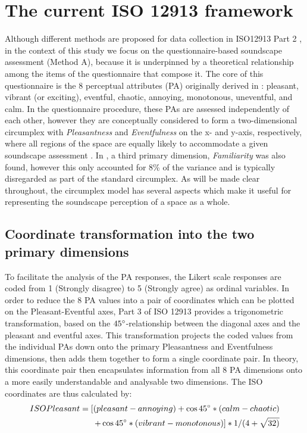 \section{The current ISO 12913 framework}
\label{sec:current}
Although different methods are proposed for data collection in ISO12913 Part 2 \citep{ISO12913Part2}, in the context of this study we focus on the questionnaire-based soundscape assessment (Method A), because it is underpinned by a theoretical relationship among the items of the questionnaire that compose it. The core of this questionnaire is the 8 perceptual attributes (PA) originally derived in \citet{Axelsson2010principal}: pleasant, vibrant (or exciting), eventful, chaotic, annoying, monotonous, uneventful, and calm. In the questionnaire procedure, these PAs are assessed independently of each other, however they are conceptually considered to form a two-dimensional circumplex with \textit{Pleasantness} and \textit{Eventfulness} on the x- and y-axis, respectively, where all regions of the space are equally likely to accommodate a given soundscape assessment \citep{Aletta2016Soundscape}. In \citet{Axelsson2010principal}, a third primary dimension, \textit{Familiarity} was also found, however this only accounted for 8\% of the variance and is typically disregarded as part of the standard circumplex. As will be made clear throughout, the circumplex model has several aspects which make it useful for representing the soundscape perception of a space as a whole.

\subsection{Coordinate transformation into the two primary dimensions}
To facilitate the analysis of the PA responses, the Likert scale responses are coded from 1 (Strongly disagree) to 5 (Strongly agree) as ordinal variables. In order to reduce the 8 PA values into a pair of coordinates which can be plotted on the Pleasant-Eventful axes, Part 3 of ISO 12913 \citep{ISO12913Part3} provides a trigonometric transformation, based on the $45\degree$-relationship between the diagonal axes and the pleasant and eventful axes. This transformation projects the coded values from the individual PAs down onto the primary Pleasantness and Eventfulness dimensions, then adds them together to form a single coordinate pair. In theory, this coordinate pair then encapsulates information from all 8 PA dimensions onto a more easily understandable and analysable two dimensions. The ISO coordinates are thus calculated by:
\begin{equation}
  \begin{split}
    \label{eqn:pleasant}
    ISO Pleasant = [(pleasant - annoying) + \cos 45\degree * (calm - chaotic) \\ + \cos 45\degree * (vibrant - monotonous)] * 1/(4+\sqrt{32)}
  \end{split}
\end{equation}

